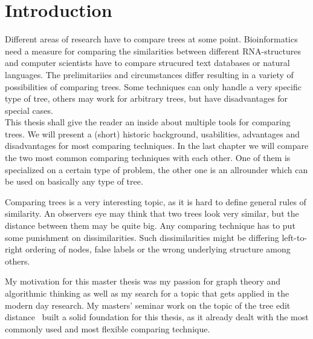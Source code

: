 \chapter{Introduction}
Different areas of research have to compare trees at some point. Bioinformatics need a measure for comparing the similarities between different RNA-structures and computer scientists have to compare strucured text databases or natural languages. The prelimitariies and circumstances differ resulting in a variety of possibilities of comparing trees. Some techniques can only handle a very specific type of tree, others may work for arbitrary trees, but have disadvantages for special cases. \\
This thesis shall give the reader an inside about multiple tools for comparing trees. We will present a (short) historic background, usabilities, advantages and disadvantages for most comparing techniques. In the last chapter we will compare the two most common comparing techniques with each other. One of them is specialized on a certain type of problem, the other one is an allrounder which can be used on basically any type of tree. 

Comparing trees is a very interesting topic, as it is hard to define general rules of similarity. An observers eye may think that two trees look very similar, but the distance between them may be quite big. Any comparing technique has to put some punishment on dissimilarities. Such dissimilarities might be differing left-to-right ordering of nodes, false labels or the wrong underlying structure among others. 

My motivation for this master thesis was my passion for graph theory and algorithmic thinking as well as my search for a topic that gets applied in the modern day research.  My masters' seminar work on the topic of the tree edit distance~\cite{And} built a solid foundation for this thesis, as it already dealt with the most commonly used and most flexible comparing technique. 